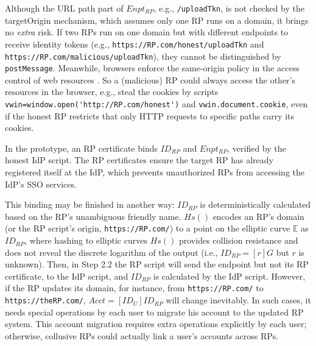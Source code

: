 Although the URL path part of $Enpt_{RP}$, e.g., \verb+/uploadTkn+,
 is not checked by the targetOrigin mechanism,
  which assumes only one RP runs on a domain,
   it brings no \emph{extra} risk.
If two RPs run on one domain but with different endpoints to receive identity tokens
        (e.g., \verb+https://RP.com/honest/uploadTkn+ and \verb+https://RP.com/malicious/uploadTkn+),
         they cannot be distinguished by \verb+postMessage+.
Meanwhile, browsers enforce
 the same-origin policy  in the access control of web resources \cite{sop}.
So
    a (malicious) RP could always access the other's resources in the browser,
        e.g., steal the cookies
        by scripts
        \verb+vwin=window.open('http://RP.com/honest')+
    and \verb+vwin.document.cookie+,
    even if the honest RP restricts that only HTTP requests to specific paths carry its cookies.


\vspace{0.8mm}
In the prototype, an RP certificate binds $ID_{RP}$ and $Enpt_{RP}$,
    verified by the honest IdP script.
The RP certificates ensure the target RP has already registered itself at the IdP,
 which prevents unauthorized RPs from accessing the IdP's SSO services.

This binding may be finished in another way:
    $ID_{RP}$ is deterministically calculated based on the RP's unambiguous friendly name.
$Hs()$ encodes an RP's domain (or the RP script's origin, \verb+https://RP.com/+) to a point on the elliptic curve $\mathbb{E}$ as $ID_{RP}$,
where
    hashing to elliptic curves $Hs()$ \cite{irtf-cfrg-hash-to-curve-16} provides collision resistance and does not reveal the discrete logarithm of the output
    (i.e., $ID_{RP} = [r]G$ but $r$ is unknown).
Then,  in Step 2.2 the RP script will send the endpoint but not its RP certificate,
to the IdP script,
 and $ID_{RP}$ is calculated by the IdP script.
However, if the RP updates its domain, for instance, from \verb+https://RP.com/+ to \verb+https://theRP.com/+,
$Acct = [ID_U]ID_{RP}$ will change inevitably.
In such cases,
    it needs special operations by each user to migrate his account
            to the updated RP system.
This account migration requires extra operations explicitly by each user;
    otherwise,
        collusive RPs could actually link a user's accounts across RPs.


